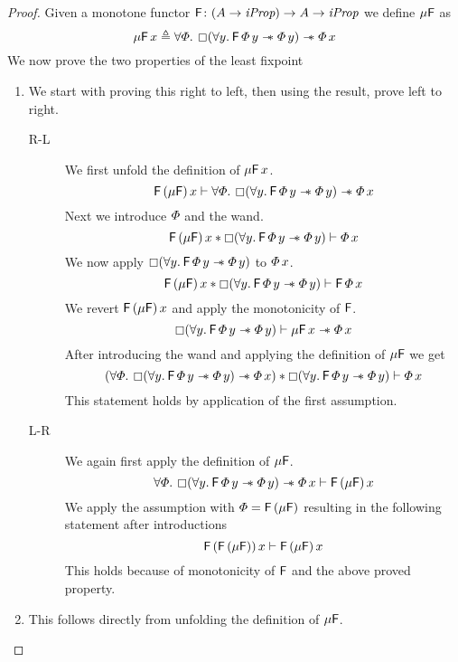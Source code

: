 \documentclass[thesis.tex]{subfiles}
\begin{document}
\begin{proof}
    Given a monotone functor $\textsf{\upshape F}\colon (A \to \textit{iProp}) \to  A \to \textit{iProp}$ we define $\mu\textsf{\upshape F}$ as
    \[ \lfp\hopred\, \var \eqdef \All \pred. \always(\All \varB. \hopred\, \pred\, \varB \wand \pred\, \varB) \wand \pred \, \var \]
    We now prove the two properties of the least fixpoint
    \begin{enumerate}
        \item We start with proving this right to left, then using the result, prove left to right.
              \begin{description}
                  \item[R-L] We first unfold the definition of $\mu\textsf{\upshape F}\, x$.
                      \[ \hopred\, (\lfp\hopred)\, \var \proves \All \pred. \always(\All \varB. \hopred\, \pred\, \varB \wand \pred\, \varB) \wand \pred \, \var \]
                      Next we introduce $\varPhi$ and the wand.
                      \[ \hopred\, (\lfp\hopred)\, \var * \always(\All \varB. \hopred\, \pred\, \varB \wand \pred\, \varB) \proves \pred \, \var \]
                      We now apply $\always(\All \varB. \hopred\, \pred\, \varB \wand \pred\, \varB)$ to $\varPhi\, x$.
                      \[ \hopred\, (\lfp\hopred)\, \var * \always(\All \varB. \hopred\, \pred\, \varB \wand \pred\, \varB) \proves \hopred\, \pred\, \var \]
                      We revert $\textsf{\upshape F}\, (\mu\textsf{\upshape F})\, x$ and apply the monotonicity of $\textsf{\upshape F}$.
                      \[ \always(\All \varB. \hopred\, \pred\, \varB \wand \pred\, \varB) \proves \lfp\hopred\, \var \wand \pred\, \var \]
                      After introducing the wand and applying the definition of $\mu\textsf{\upshape F}$ we get
                      \[ (\All \pred. \always(\All \varB. \hopred\, \pred\, \varB \wand \pred\, \varB) \wand \pred \, \var) * \always(\All \varB. \hopred\, \pred\, \varB \wand \pred\, \varB) \proves \pred\, \var \]
                      This statement holds by application of the first assumption.
                  \item[L-R] We again first apply the definition of $\mu\textsf{\upshape F}$.
                      \[ \All \pred. \always(\All \varB. \hopred\, \pred\, \varB \wand \pred\, \varB) \wand \pred \, \var \proves \hopred\, (\lfp\hopred)\, \var \]
                      We apply the assumption with $\varPhi = \textsf{\upshape F}\, (\mu\textsf{\upshape F})$ resulting in the following statement after introductions
                      \[ \textsf{\upshape F}\, (\textsf{\upshape F}\, (\mu\textsf{\upshape F}))\, x \vdash \textsf{\upshape F}\, (\mu\textsf{\upshape F})\, x \]
                      This holds because of monotonicity of $\textsf{\upshape F}$ and the above proved property.
              \end{description}
        \item This follows directly from unfolding the definition of $\mu\textsf{\upshape F}$. \qedhere
    \end{enumerate}
\end{proof}
\end{document}
